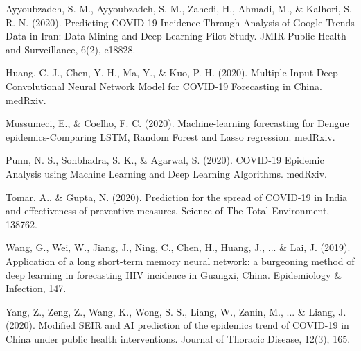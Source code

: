 ﻿\documentclass{article}
\begin{document}
\begin{multicols}{2}
\begin{thebibliography}{7}

\bibitem{}
Ayyoubzadeh, S. M., Ayyoubzadeh, S. M., Zahedi, H., Ahmadi, M., \& Kalhori, S. R.
N. (2020). Predicting COVID-19 Incidence Through Analysis of Google Trends Data
in Iran: Data Mining and Deep Learning Pilot Study. JMIR Public Health and
Surveillance, 6(2), e18828.

\bibitem{}
Huang, C. J., Chen, Y. H., Ma, Y., \& Kuo, P. H. (2020). Multiple-Input Deep
Convolutional Neural Network Model for COVID-19 Forecasting in China. medRxiv.

\bibitem{}
Mussumeci, E., \& Coelho, F. C. (2020). Machine-learning forecasting for Dengue
epidemics-Comparing LSTM, Random Forest and Lasso regression. medRxiv.

\bibitem{}
Punn, N. S., Sonbhadra, S. K., \& Agarwal, S. (2020). COVID-19 Epidemic Analysis
using Machine Learning and Deep Learning Algorithms. medRxiv.

\bibitem{}
Tomar, A., \& Gupta, N. (2020). Prediction for the spread of COVID-19 in India
and effectiveness of preventive measures. Science of The Total Environment,
138762.

\bibitem{}
Wang, G., Wei, W., Jiang, J., Ning, C., Chen, H., Huang, J., ... \& Lai, J.
(2019). Application of a long short-term memory neural network: a burgeoning
method of deep learning in forecasting HIV incidence in Guangxi, China.
Epidemiology \& Infection, 147.

\bibitem{}
Yang, Z., Zeng, Z., Wang, K., Wong, S. S., Liang, W., Zanin, M., ... \& Liang, J.
(2020). Modified SEIR and AI prediction of the epidemics trend of COVID-19 in
China under public health interventions. Journal of Thoracic Disease, 12(3),
165.

\end{thebibliography}

\end{multicols}
\end{document}
